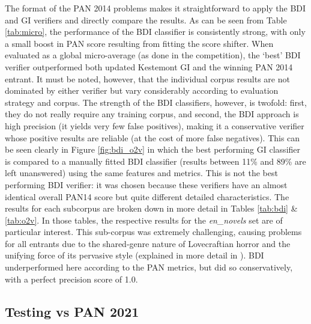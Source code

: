 \documentclass[
    hf
]{ceurart}
\begin{document}
The format of the PAN 2014 problems makes it straightforward to apply the BDI and GI verifiers and
directly compare the results. As can be seen from Table \ref{tab:micro}, the performance of the BDI
classifier is consistently strong, with only a small boost in PAN score resulting from fitting the
score shifter. When evaluated as a global micro-average (as done in the competition), the `best' BDI
verifier outperformed both updated Kestemont GI and the winning PAN 2014 entrant. It must be noted,
however, that the individual corpus results are not dominated by either verifier but vary
considerably according to evaluation strategy and corpus. The strength of the BDI classifiers,
however, is twofold: first, they do not really require any training corpus, and second, the BDI
approach is high precision (it yields very few false positives), making it a conservative verifier
whose positive results are reliable (at the cost of more false negatives). This can be seen clearly
in Figure \ref{fig:bdi_o2v} in which the best performing GI classifier is compared to a manually
fitted BDI classifier (results between 11\% and 89\% are left unanswered) using the same features
and metrics. This is not the best performing BDI verifier: it was chosen because these verifiers
have an almost identical overall PAN14 score but quite different detailed characteristics. The
results for each subcorpus are broken down in more detail in Tables \ref{tab:bdi} \& \ref{tab:o2v}.
In those tables, the respective results for the \textit{en\_novels} set are of particular interest.
This sub-corpus was extremely challenging, causing problems for all entrants due to the shared-genre
nature of Lovecraftian horror and the unifying force of its pervasive style (explained in more
detail in \cite[882]{pan_2014}). BDI underperformed here according to the PAN metrics, but did so
conservatively, with a perfect precision score of 1.0.

\subsection{Testing vs PAN 2021}
\end{document}
